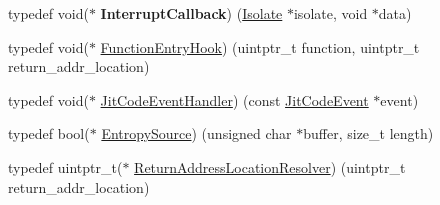\begin{DoxyCompactItemize}
\item 
\hypertarget{namespacev8_af07fcf2ef61237b7ba67242700b6a875}{}typedef void($\ast$ {\bfseries Interrupt\+Callback}) (\hyperlink{classv8_1_1Isolate}{Isolate} $\ast$isolate, void $\ast$data)\label{namespacev8_af07fcf2ef61237b7ba67242700b6a875}

\item 
typedef void($\ast$ \hyperlink{namespacev8_aaf07fb6bb13f295da3c6568938b7dec5}{Function\+Entry\+Hook}) (uintptr\+\_\+t function, uintptr\+\_\+t return\+\_\+addr\+\_\+location)
\item 
typedef void($\ast$ \hyperlink{namespacev8_a39243bc91e63d64d111452fdb98c4733}{Jit\+Code\+Event\+Handler}) (const \hyperlink{structv8_1_1JitCodeEvent}{Jit\+Code\+Event} $\ast$event)
\item 
typedef bool($\ast$ \hyperlink{namespacev8_ab699f4bbbb56350e6e915682e420fcdc}{Entropy\+Source}) (unsigned char $\ast$buffer, size\+\_\+t length)
\item 
typedef uintptr\+\_\+t($\ast$ \hyperlink{namespacev8_a8ce54c75241be41ff6a25e9944eefd2a}{Return\+Address\+Location\+Resolver}) (uintptr\+\_\+t return\+\_\+addr\+\_\+location)
\end{DoxyCompactItemize}
